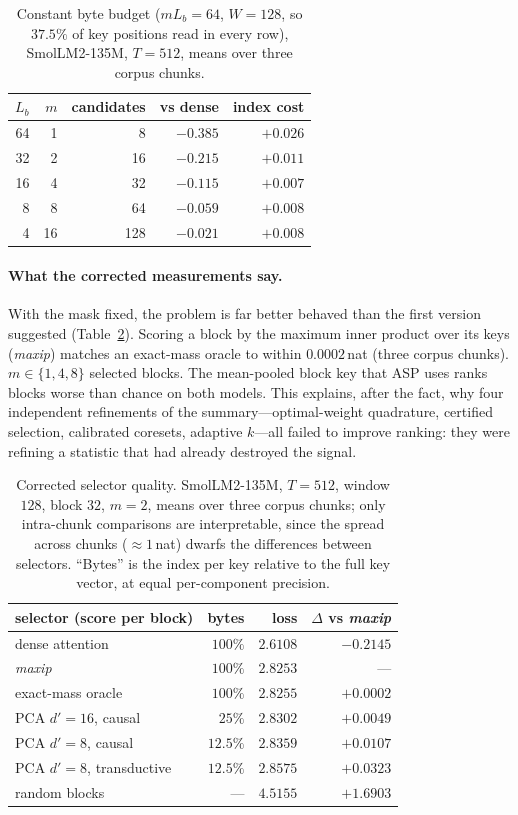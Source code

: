 \documentclass[sigconf,nonacm,11pt]{acmart}
\begin{document}
\begin{table}[t]
\centering
\caption{Constant byte budget ($mL_b=64$, $W=128$, so $37.5\%$ of key positions
read in every row), SmolLM2-135M, $T=512$, means over three corpus chunks.}
\label{tab:budget}
\begin{tabular}{rrrrr}
\toprule
$L_b$ & $m$ & candidates & vs dense & index cost \\
\midrule
64 & 1 & 8 & $-0.385$ & $+0.026$ \\
32 & 2 & 16 & $-0.215$ & $+0.011$ \\
16 & 4 & 32 & $-0.115$ & $+0.007$ \\
8 & 8 & 64 & $-0.059$ & $+0.008$ \\
4 & 16 & 128 & $-0.021$ & $+0.008$ \\
\bottomrule
\end{tabular}
\end{table}

\paragraph{What the corrected measurements say.} With the mask fixed, the problem
is far better behaved than the first version suggested (Table~\ref{tab:corrected}).
Scoring a block by the maximum inner product over its keys (\emph{maxip}) matches
an exact-mass oracle to within $0.0002$\,nat (three corpus chunks).
$m\in\{1,4,8\}$ selected blocks. The mean-pooled block key that ASP uses ranks
blocks worse than chance on both models. This explains, after the fact, why four
independent refinements of the summary---optimal-weight quadrature, certified
selection, calibrated coresets, adaptive $k$---all failed to improve ranking:
they were refining a statistic that had already destroyed the signal.

\begin{table}[t]
\centering\small
\caption{Corrected selector quality. SmolLM2-135M, $T=512$, window $128$, block
$32$, $m=2$, means over three corpus chunks; only intra-chunk comparisons are
interpretable, since the spread across chunks ($\approx1$\,nat) dwarfs the
differences between selectors. ``Bytes'' is the index per key relative to the full
key vector, at equal per-component precision.}
\label{tab:corrected}
\begin{tabular}{lrrr}
\toprule
selector (score per block) & bytes & loss & $\Delta$ vs \emph{maxip} \\
\midrule
dense attention       & $100\%$   & $2.6108$ & $-0.2145$ \\
\emph{maxip}          & $100\%$   & $2.8253$ & --- \\
exact-mass oracle     & $100\%$   & $2.8255$ & $+0.0002$ \\
PCA $d'=16$, causal   & $25\%$    & $2.8302$ & $+0.0049$ \\
PCA $d'=8$, causal    & $12.5\%$  & $2.8359$ & $+0.0107$ \\
PCA $d'=8$, transductive & $12.5\%$ & $2.8575$ & $+0.0323$ \\
random blocks         & ---       & $4.5155$ & $+1.6903$ \\
\bottomrule
\end{tabular}
\end{table}
\end{document}
